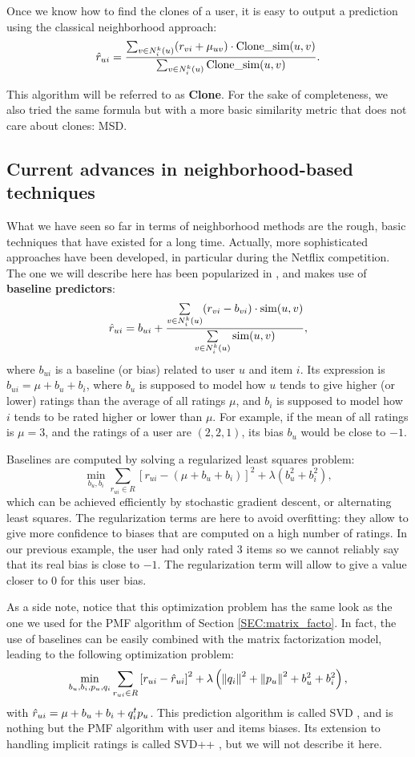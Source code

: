 \noindent
Once we know how to find the clones of a user, it is easy to output
a prediction using the classical neighborhood approach:
$$\hat{r}_{ui} = \frac{\sum_{v \in N_i^k(u)} (r_{vi} + \mu_{uv}) \cdot \text{Clone\_sim}(u,
v)}{\sum_{v \in N_i^k(u)} \text{Clone\_sim}(u, v)}.$$

This algorithm will be referred to as \textbf{Clone}. For the sake of completeness, we
also tried the same formula but with a more basic similarity metric that does
not care about clones: MSD.

\subsection{Current advances in neighborhood-based techniques}
\label{SEC:current_advances_neighborhood_techniques}

What we have seen so far in terms of neighborhood methods are the rough, basic
techniques that have existed for a long time. Actually, more sophisticated
approaches have been developed, in particular during the Netflix competition.
The one we will describe here has been popularized in \cite{BelKorSIGKDD2007},
and makes use of \textbf{baseline predictors}:
$$\hat{r}_{ui} = b_{ui} + \frac{\sum\limits_{v \in N_i^k(u)} (r_{vi} - b_{vi})
\cdot \text{sim}(u, v)} {\sum\limits_{v \in N_i^k(u)}\text{sim}(u, v)},$$
where $b_{ui}$ is a baseline (or bias) related to user $u$ and item $i$. Its
expression is $b_{ui} = \mu + b_u + b_i$, where $b_u$ is supposed to model how
$u$ tends to give higher (or lower) ratings than the average of all ratings
$\mu$, and $b_i$ is supposed to model how $i$ tends to be rated higher or lower
than $\mu$. For example, if the mean of all ratings is $\mu = 3$, and the
ratings of a user are $(2, 2, 1)$, its bias $b_u$ would be close to $-1$.

Baselines are computed by solving a regularized least squares problem:
$$\min_{b_u, b_i} \sum_{r_{ui} \in R} \left[r_{ui} - (\mu + b_u + b_i)\right]^2
+ \lambda \left(b_u^2 + b_i^2 \right),$$
which can be achieved efficiently by stochastic gradient descent, or
alternating least squares. The regularization terms are here to avoid
overfitting: they allow to give more confidence to biases that are computed on
a high number of ratings. In our previous example, the user had only rated $3$
items so we cannot reliably say that its real bias is close to $-1$.
The regularization term will allow to give a value closer to 0 for this user
bias.

As a side note, notice that this optimization problem has the same look as the
one we used for the PMF algorithm of Section \ref{SEC:matrix_facto}. In fact, the use of
baselines can be easily combined with the matrix factorization model, leading
to the following optimization problem:
$$\min_{b_u, b_i, p_u, q_i} \sum_{r_{ui} \in R} \left[r_{ui} - \hat{r}_{ui}\right]^2
+ \lambda \left({\left\lVert q_i\right\rVert}_{}^2 + {\left\lVert p_u\right\rVert}_{}^2 + b_u^2 + b_i^2 \right),$$
with $\hat{r}_{ui} = \mu + b_u + b_i + q_i^tp_u$. This prediction algorithm is
called SVD \cite{KorBel11}, and is nothing but the PMF algorithm with user and
items biases. Its extension to handling implicit ratings is called SVD++
\cite{KorBel11}, but we will not describe it here.

